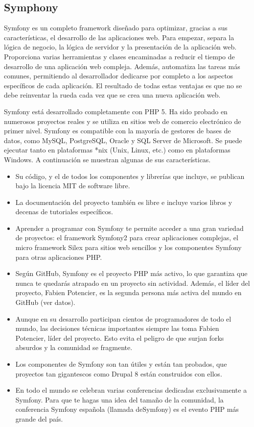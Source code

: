 \subsection{Symphony}

Symfony es un completo framework diseñado para optimizar, gracias a sus características, el desarrollo de las aplicaciones web. Para empezar, separa la lógica de negocio, la lógica de servidor y la presentación de la aplicación web. Proporciona varias herramientas y clases encaminadas a reducir el tiempo de desarrollo de una aplicación web compleja. Además, automatiza las tareas más comunes, permitiendo al desarrollador dedicarse por completo a los aspectos específicos de cada aplicación. El resultado de todas estas ventajas es que no se debe reinventar la rueda cada vez que se crea una nueva aplicación web.

Symfony está desarrollado completamente con PHP 5. Ha sido probado en numerosos proyectos reales y se utiliza en sitios web de comercio electrónico de primer nivel. Symfony es compatible con la mayoría de gestores de bases de datos, como MySQL, PostgreSQL, Oracle y SQL Server de Microsoft. Se puede ejecutar tanto en plataformas *nix (Unix, Linux, etc.) como en plataformas Windows. A continuación se muestran algunas de sus características.

\begin{itemize}

\item Su código, y el de todos los componentes y librerías que incluye, se publican bajo la licencia MIT de software libre.
\item La documentación del proyecto también es libre e incluye varios libros y decenas de tutoriales específicos.
\item Aprender a programar con Symfony te permite acceder a una gran variedad de proyectos: el framework Symfony2 para crear aplicaciones complejas, el micro framework Silex para sitios web sencillos y los componentes Symfony para otras aplicaciones PHP.
\item Según GitHub, Symfony es el proyecto PHP más activo, lo que garantiza que nunca te quedarás atrapado en un proyecto sin actividad. Además, el líder del proyecto, Fabien Potencier, es la segunda persona más activa del mundo en GitHub (ver datos).
\item Aunque en su desarrollo participan cientos de programadores de todo el mundo, las decisiones técnicas importantes siempre las toma Fabien Potencier, líder del proyecto. Esto evita el peligro de que surjan forks absurdos y la comunidad se fragmente.
\item Los componentes de Symfony son tan útiles y están tan probados, que proyectos tan gigantescos como Drupal 8 están construidos con ellos.
\item En todo el mundo se celebran varias conferencias dedicadas exclusivamente a Symfony. Para que te hagas una idea del tamaño de la comunidad, la conferencia Symfony española (llamada deSymfony) es el evento PHP más grande del país.
 
\end{itemize}

